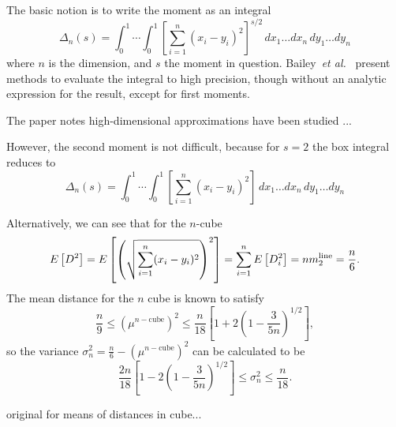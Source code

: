 The basic notion is to write the moment as an integral
\begin{equation}
  \label{eq:moment_n_cube}
  \Delta_n(s) = \int_0^1 \cdots \int_0^1
        \left[ \sum_{i=1}^n (x_i - y_i)^2 \right]^{s/2}
        \, dx_1 \ldots  dx_n   \, dy_1 \ldots  dy_n  
\end{equation}
where $n$ is the dimension, and $s$ the moment in
question. Bailey~{\em et al.}~\cite{Bailey2007196} present methods to
evaluate the integral to high precision, though without an analytic
expression for the result, except for first moments. 




The paper notes high-dimensional approximations have been studied ...



However, the second moment is not difficult, because for $s=2$ the box
integral reduces to 
\begin{equation}
  \label{eq:moment_n_cube}
  \Delta_n(s) = \int_0^1 \cdots \int_0^1
        \left[ \sum_{i=1}^n (x_i - y_i)^2 \right]
        \, dx_1 \ldots  dx_n   \, dy_1 \ldots  dy_n  
\end{equation}

Alternatively, we can see that for the $n$-cube
\begin{equation}
  E\left[ D^2 \right]
           = E\left[ \left( \sqrt{\sum_{i=1}^n (x_i - y_i)^2} \right)^2 \right]
           = \sum_{i=1}^n E\left[ D_i^2 \right]
           = n  m_2^{\rm line}
           = \frac{n}{6}.
\end{equation}
The mean distance for the $n$ cube is known to satisfy~\cite{anderssen76:_concer,weisstein:_cube_line_picking} 
\begin{equation}
  \frac{n}{9} \leq \left( \mu^{n-\mbox{cube}} \right)^2
                    \leq  \frac{n}{18} 
                               \left[ 1 + 2 \left(1-\frac{3}{5n}\right)^{1/2} \right]
                        ,
\end{equation}
so the variance $\sigma^2_n = \frac{n}{6} - \left( \mu^{n-\mbox{cube}}
\right)^2$ can be calculated to be 
\begin{equation}
  \frac{2n}{18}\left[ 1 - 2 \left(1-\frac{3}{5n}\right)^{1/2} \right]
        \leq \sigma^2_n
        \leq \frac{n}{18}.
\end{equation}


original for means of distances in cube...
\cite{anderssen76:_concer}